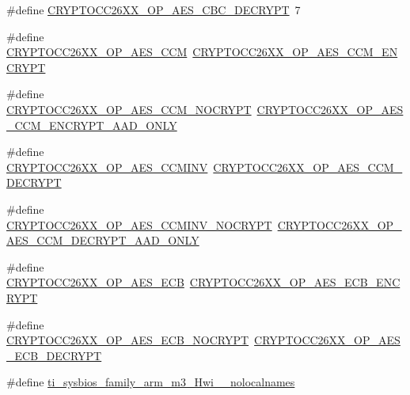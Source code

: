 \begin{DoxyCompactItemize}
\item 
\#define \hyperlink{_crypto_c_c26_x_x_8h_a6a2cf7f9abef28bcc0d503d3b7e9a8d3}{C\+R\+Y\+P\+T\+O\+C\+C26\+X\+X\+\_\+\+O\+P\+\_\+\+A\+E\+S\+\_\+\+C\+B\+C\+\_\+\+D\+E\+C\+R\+Y\+P\+T}~7
\item 
\#define \hyperlink{_crypto_c_c26_x_x_8h_a6ab0b59b64c06856c431f91a7e43b34d}{C\+R\+Y\+P\+T\+O\+C\+C26\+X\+X\+\_\+\+O\+P\+\_\+\+A\+E\+S\+\_\+\+C\+C\+M}~\hyperlink{_crypto_c_c26_x_x_8h_a00bd9c4c4f823576ed52a99cc1c49df4}{C\+R\+Y\+P\+T\+O\+C\+C26\+X\+X\+\_\+\+O\+P\+\_\+\+A\+E\+S\+\_\+\+C\+C\+M\+\_\+\+E\+N\+C\+R\+Y\+P\+T}
\item 
\#define \hyperlink{_crypto_c_c26_x_x_8h_acc1c159d62112b90da86ecd846994f98}{C\+R\+Y\+P\+T\+O\+C\+C26\+X\+X\+\_\+\+O\+P\+\_\+\+A\+E\+S\+\_\+\+C\+C\+M\+\_\+\+N\+O\+C\+R\+Y\+P\+T}~\hyperlink{_crypto_c_c26_x_x_8h_adbc0e20b32a3e1b968ea9cb05cd2bde4}{C\+R\+Y\+P\+T\+O\+C\+C26\+X\+X\+\_\+\+O\+P\+\_\+\+A\+E\+S\+\_\+\+C\+C\+M\+\_\+\+E\+N\+C\+R\+Y\+P\+T\+\_\+\+A\+A\+D\+\_\+\+O\+N\+L\+Y}
\item 
\#define \hyperlink{_crypto_c_c26_x_x_8h_a38c8bce4f77947e99d2d877e8d3dee7e}{C\+R\+Y\+P\+T\+O\+C\+C26\+X\+X\+\_\+\+O\+P\+\_\+\+A\+E\+S\+\_\+\+C\+C\+M\+I\+N\+V}~\hyperlink{_crypto_c_c26_x_x_8h_af57bb0e27a57946d9fa6ac747d534f26}{C\+R\+Y\+P\+T\+O\+C\+C26\+X\+X\+\_\+\+O\+P\+\_\+\+A\+E\+S\+\_\+\+C\+C\+M\+\_\+\+D\+E\+C\+R\+Y\+P\+T}
\item 
\#define \hyperlink{_crypto_c_c26_x_x_8h_a445002cd50ecda94d48f437bc213a499}{C\+R\+Y\+P\+T\+O\+C\+C26\+X\+X\+\_\+\+O\+P\+\_\+\+A\+E\+S\+\_\+\+C\+C\+M\+I\+N\+V\+\_\+\+N\+O\+C\+R\+Y\+P\+T}~\hyperlink{_crypto_c_c26_x_x_8h_a2e9761d83b7e451861e3d1891213d069}{C\+R\+Y\+P\+T\+O\+C\+C26\+X\+X\+\_\+\+O\+P\+\_\+\+A\+E\+S\+\_\+\+C\+C\+M\+\_\+\+D\+E\+C\+R\+Y\+P\+T\+\_\+\+A\+A\+D\+\_\+\+O\+N\+L\+Y}
\item 
\#define \hyperlink{_crypto_c_c26_x_x_8h_a9e96510f981e65f0c46c19684daaff07}{C\+R\+Y\+P\+T\+O\+C\+C26\+X\+X\+\_\+\+O\+P\+\_\+\+A\+E\+S\+\_\+\+E\+C\+B}~\hyperlink{_crypto_c_c26_x_x_8h_af72980622fb0dc9555587ef90083b3ef}{C\+R\+Y\+P\+T\+O\+C\+C26\+X\+X\+\_\+\+O\+P\+\_\+\+A\+E\+S\+\_\+\+E\+C\+B\+\_\+\+E\+N\+C\+R\+Y\+P\+T}
\item 
\#define \hyperlink{_crypto_c_c26_x_x_8h_aea29a252e094057f90d0fccd938b8a0d}{C\+R\+Y\+P\+T\+O\+C\+C26\+X\+X\+\_\+\+O\+P\+\_\+\+A\+E\+S\+\_\+\+E\+C\+B\+\_\+\+N\+O\+C\+R\+Y\+P\+T}~\hyperlink{_crypto_c_c26_x_x_8h_a74881034cf440f28a91c5263fc728097}{C\+R\+Y\+P\+T\+O\+C\+C26\+X\+X\+\_\+\+O\+P\+\_\+\+A\+E\+S\+\_\+\+E\+C\+B\+\_\+\+D\+E\+C\+R\+Y\+P\+T}
\item 
\#define \hyperlink{_crypto_c_c26_x_x_8h_aaa17ecf48f5762e2e1bdb0bab8aacf0c}{ti\+\_\+sysbios\+\_\+family\+\_\+arm\+\_\+m3\+\_\+\+Hwi\+\_\+\+\_\+nolocalnames}
\end{DoxyCompactItemize}
